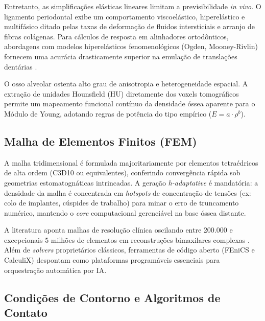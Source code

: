 Entretanto, as simplificações elásticas lineares limitam a previsibilidade \textit{in vivo}. O ligamento periodontal exibe um comportamento viscoelástico, hiperelástico e multifásico ditado pelas taxas de deformação de fluidos intersticiais e arranjo de fibras colágenas. Para cálculos de resposta em alinhadores ortodônticos, abordagens com modelos hiperelásticos fenomenológicos (Ogden, Mooney-Rivlin) fornecem uma acurácia drasticamente superior na emulação de translações dentárias \cite{zhang2024recursive}.

O osso alveolar ostenta alto grau de anisotropia e heterogeneidade espacial. A extração de unidades Hounsfield (HU) diretamente dos voxels tomográficos permite um mapeamento funcional contínuo da densidade óssea aparente para o Módulo de Young, adotando regras de potência do tipo empírico ($E = a \cdot \rho^b$).

\subsection{Malha de Elementos Finitos (FEM)}
\label{subsec:malha-fem}

A malha tridimensional é formulada majoritariamente por elementos tetraédricos de alta ordem (C3D10 ou equivalentes), conferindo convergência rápida sob geometrias estomatognáticas intrincadas. A geração \textit{h-adaptative} é mandatória: a densidade da malha é concentrada em \textit{hotspots} de concentração de tensões (ex: colo de implantes, cúspides de trabalho) para minar o erro de truncamento numérico, mantendo o \textit{core} computacional gerenciável na base óssea distante.

A literatura aponta malhas de resolução clínica oscilando entre 200.000 e excepcionais 5 milhões de elementos em reconstruções bimaxilares complexas \cite{roy2025editorial}. Além de \textit{solvers} proprietários clássicos, ferramentas de código aberto (FEniCS e CalculiX) despontam como plataformas programáveis essenciais para orquestração automática por IA.

\subsection{Condições de Contorno e Algoritmos de Contato}
\label{subsec:bc}

